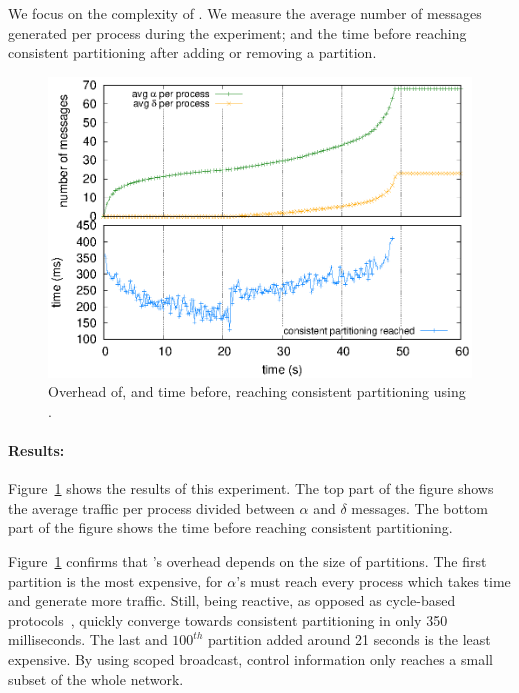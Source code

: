 \noindent We focus on the complexity of \NAME. We measure the average
number of messages generated per process during the experiment; and
the time before reaching consistent partitioning after adding or
removing a partition.

\begin{figure}
  \centering\includegraphics[width=0.99\columnwidth]{img/as_cast_complexity.eps}
  \caption{\label{fig:complexity}Overhead of, and time before,
    reaching consistent partitioning using \NAME.}
\end{figure}

\paragraph{Results:}

Figure~\ref{fig:complexity} shows the results of this experiment. The
top part of the figure shows the average traffic per process divided
between $\alpha$ and $\delta$ messages. The bottom part of the figure
shows the time before reaching consistent partitioning.

\noindent Figure~\ref{fig:complexity} confirms that \NAME's overhead
depends on the size of partitions. The first partition is the most
expensive, for $\alpha$'s must reach every process which takes time
and generate more traffic. Still, being reactive, as opposed as
cycle-based protocols~\cite{jelasity2007gossip}, \NAME quickly
converge towards consistent partitioning in only 350 milliseconds. The
last and $100^{th}$ partition added around 21 seconds is the least
expensive. By using scoped broadcast, control information only reaches
a small subset of the whole network.

